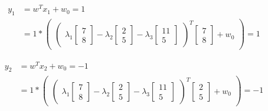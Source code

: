 \documentclass[12pt]{report}
\begin{document}
\begin{equation*}
	\begin{aligned}
		y_{1} & =  w^T x_{1} + w_{0} = 1                \\
		      & = 1 * \begin{pmatrix}
			              \begin{pmatrix}
				\lambda_{1}\begin{bmatrix}
					           7 \\
					           8
				           \end{bmatrix} -

				\lambda_{2}\begin{bmatrix}
					           2 \\
					           5
				           \end{bmatrix} -

				\lambda_{3}\begin{bmatrix}
					           11 \\
					           5
				           \end{bmatrix}
			\end{pmatrix}   ^ T
			              \begin{bmatrix}
				7 \\
				8
			\end{bmatrix} + w_{0}
		              \end{pmatrix} = 1
	\end{aligned}
\end{equation*}

\begin{equation*}
	\begin{aligned}
		y_{2} & =  w^T x_{2} + w_{0} = -1               \\
		      & = 1 * \begin{pmatrix}
			              \begin{pmatrix}
				\lambda_{1}\begin{bmatrix}
					           7 \\
					           8
				           \end{bmatrix} -

				\lambda_{2}\begin{bmatrix}
					           2 \\
					           5
				           \end{bmatrix} -

				\lambda_{3}\begin{bmatrix}
					           11 \\
					           5
				           \end{bmatrix}
			\end{pmatrix}  ^ T
			              \begin{bmatrix}
				2 \\
				5
			\end{bmatrix} + w_{0}
		              \end{pmatrix} = -1
	\end{aligned}
\end{equation*}
\end{document}
